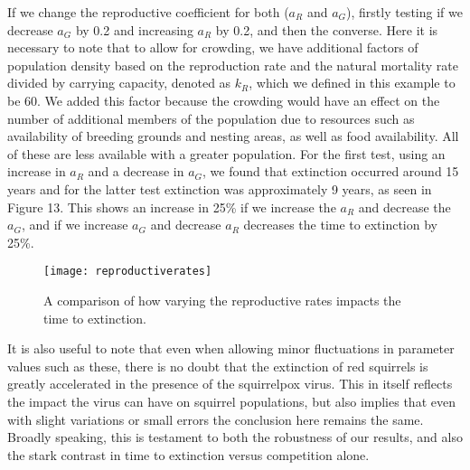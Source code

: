 \documentclass{article}
\begin{document}
If we change the reproductive coefficient for both ($a_{R}$ and $a_{G}$), firstly testing if we decrease $a_{G}$ by 0.2 and increasing $a_{R}$ by 0.2, and then the converse. Here it is necessary to note that to allow for crowding, we have additional factors of population density based on the reproduction rate and the natural mortality rate divided by carrying capacity, denoted as $k_{R}$, which we defined in this example to be 60. We added this factor because the crowding would have an effect on the number of additional members of the population due to resources such as availability of breeding grounds and nesting areas, as well as food availability. All of these are less available with a greater population. For the first test, using an increase in $a_{R}$ and a decrease in $a_{G}$, we found that extinction occurred around 15 years and for the latter test extinction was approximately 9 years, as seen in Figure 13. This shows an increase in 25\% if we increase the $a_{R}$ and decrease the $a_{G}$, and if we increase $a_{G}$ and decrease $a_{R}$ decreases the time to extinction by 25\%. 

\begin{figure}[H]
\begin{center}
\texttt{[image: reproductiverates]}
\caption{A comparison of how varying the reproductive rates impacts the time to extinction.}
\end{center}
\end{figure}

It is also useful to note that even when allowing minor fluctuations in parameter values such as these, there is no doubt that the extinction of red squirrels is greatly accelerated in the presence of the squirrelpox virus. This in itself reflects the impact the virus can have on squirrel populations, but also implies that even with slight variations or small errors the conclusion here remains the same. Broadly speaking, this is testament to both the robustness of our results, and also the stark contrast in time to extinction versus competition alone.
\end{document}

